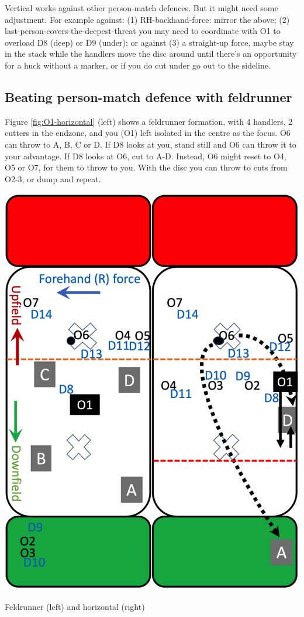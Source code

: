 \documentclass{tufte-handout}
\begin{document}
Vertical works
against other person-match defences. 
But it might need 
some adjustment.
For example
against: (1) RH-backhand-force: mirror the above; 
(2) last-person-covers-the-deepest-threat
you may need to coordinate with O1 
to overload D8 (deep) 
or D9 (under); or
against (3) a straight-up force, 
maybe stay in the stack 
while the handlers move the disc around
until there's an opportunity
for a huck without a marker, 
or if you do cut under go out to the sideline. 


\subsection{Beating person-match defence with feldrunner}
\label{sec:feld}
Figure \ref{fig:O1-horizontal} (left) 
shows a feldrunner formation, 
with 4 handlers, 
2 cutters 
in the endzone,
and you 
(O1) 
left  
isolated 
in the centre
as the focus. 
O6 can throw 
to A,
B, 
C 
or D. 
If D8 looks at you, 
stand still and 
O6 can throw it 
to your advantage. 
If D8
looks at O6, 
cut to A-D. 
Instead, 
O6 might reset 
to O4, O5 or O7, 
for them to 
throw to you. 
With the disc 
you can throw
to cuts from O2-3, 
or dump and repeat. 

\begin{marginfigure}%
  \includegraphics[width=\linewidth]{O1-horizontal}
  \caption{Feldrunner (left) and horizontal (right)}
  \label{fig:O1-horizontal}
\end{marginfigure}
\end{document}

